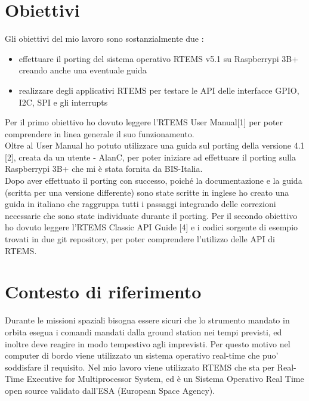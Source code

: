 \documentclass[a4paper,12pt,titlepage,oneside]{book}
\begin{document}
\section*{Obiettivi}
Gli obiettivi del mio lavoro sono sostanzialmente due :
\begin{itemize}
\item effettuare il porting del sistema operativo RTEMS v5.1 su Raspberrypi 3B+ creando anche una eventuale guida
\item realizzare degli applicativi RTEMS per testare le API delle interfacce GPIO, I2C, SPI e gli interrupts
\end{itemize}
Per il primo obiettivo ho dovuto leggere l'RTEMS User Manual[1] per poter comprendere in linea generale il suo funzionamento.\\
Oltre al User Manual ho potuto utilizzare una guida sul porting della versione 4.1 [2],  creata da un utente - AlanC, per  poter iniziare ad effettuare il porting sulla Raspberrypi 3B+ che mi è stata fornita da BIS-Italia.\\
Dopo aver effettuato il porting con successo, poiché la documentazione e la guida (scritta per una versione differente) sono state scritte in inglese ho creato una guida in italiano che raggruppa tutti i passaggi integrando delle correzioni necessarie che sono state individuate durante il porting.
Per il secondo obiettivo ho dovuto leggere l'RTEMS Classic API Guide [4] e i codici sorgente di esempio trovati in due git repository, per poter comprendere l'utilizzo delle API di RTEMS.

\section*{Contesto di riferimento}
Durante le missioni spaziali bisogna essere sicuri che lo strumento mandato in orbita esegua i comandi mandati dalla ground station nei tempi previsti, ed inoltre deve reagire in modo tempestivo agli imprevisti.
Per questo motivo nel computer di bordo viene utilizzato un sistema operativo real-time che puo' soddisfare il requisito.
Nel mio lavoro viene utilizzato RTEMS che sta per Real-Time Executive for Multiprocessor System, ed è un Sistema Operativo Real Time open source validato dall'ESA (European Space Agency).
\end{document}
